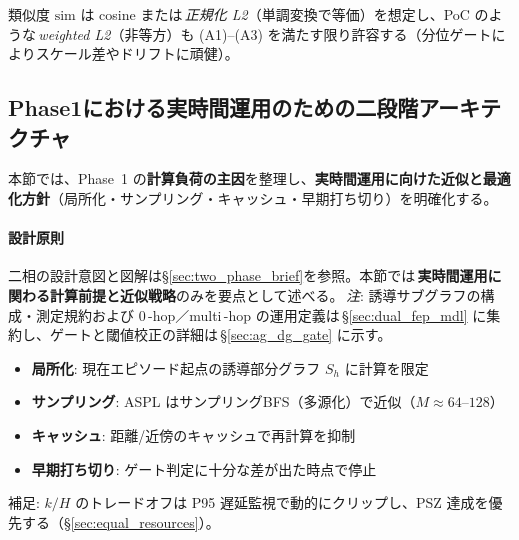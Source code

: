\documentclass[ja=standard,xelatex]{bxjsarticle}
\begin{document}
\noindent 類似度 $\mathrm{sim}$ は cosine または\,\emph{正規化 L2}（単調変換で等価）を想定し、PoC のような\,\emph{weighted L2}（非等方）も (A1)–(A3) を満たす限り許容する（分位ゲートによりスケール差やドリフトに頑健）。


\subsection{Phase1における実時間運用のための二段階アーキテクチャ}
\label{sec:ged_complexity}

本節では、Phase~1 の\textbf{計算負荷の主因}を整理し、\textbf{実時間運用に向けた近似と最適化方針}（局所化・サンプリング・キャッシュ・早期打ち切り）を明確化する。

\paragraph{設計原則}
二相の設計意図と図解は\S\ref{sec:two_phase_brief}を参照。本節では\,\textbf{実時間運用に関わる計算前提と近似戦略}のみを要点として述べる。\,\textit{注}: 誘導サブグラフの構成・測定規約および 0\,\mbox{-}hop／multi\,\mbox{-}hop の運用定義は\,\S\ref{sec:dual_fep_mdl} に集約し、ゲートと閾値校正の詳細は\,\S\ref{sec:ag_dg_gate} に示す。
\begin{itemize}[leftmargin=*]
  \item \textbf{局所化}: 現在エピソード起点の誘導部分グラフ $S_h$ に計算を限定
  \item \textbf{サンプリング}: ASPL はサンプリングBFS（多源化）で近似（$M\approx64$–$128$）
  \item \textbf{キャッシュ}: 距離/近傍のキャッシュで再計算を抑制
  \item \textbf{早期打ち切り}: ゲート判定に十分な差が出た時点で停止
\end{itemize}
\noindent 補足: $k/H$ のトレードオフは P95 遅延監視で動的にクリップし、PSZ 達成を優先する（\S\ref{sec:equal_resources}）。
\end{document}
